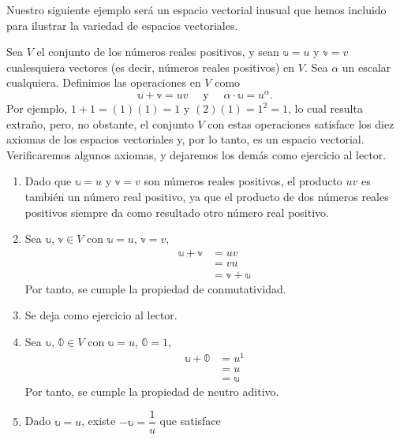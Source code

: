 \newpage

Nuestro siguiente ejemplo será un espacio vectorial inusual que hemos incluido para ilustrar la variedad de espacios vectoriales.

\begin{examplebox}{}{}
    Sea $V$ el conjunto de los números reales positivos, y sean $\mathbb{u} = u$ y $\mathbb{v} = v$ cualesquiera vectores (es decir, números reales positivos) en $V$. Sea $\alpha$ un escalar cualquiera. Definimos las operaciones en $V$ como
    $$\mathbb{u} + \mathbb{v} = uv \quad \text{ y } \quad \alpha \cdot \mathbb{u} = u^{\alpha}.$$
    Por ejemplo, $1 + 1 = (1)(1) = 1$ y $(2)(1) = 1^2 = 1$, lo cual resulta extraño, pero, no obstante, el conjunto $V$ con estas operaciones satisface los diez axiomas de los espacios vectoriales y, por lo tanto, es un espacio vectorial. Verificaremos algunos axiomas, y dejaremos los demás como ejercicio al lector.
    \begin{enumerate}[label=\roman*), topsep=6pt, itemsep=0pt]
        \item Dado que $\mathbb{u} = u$ y $\mathbb{v} = v$ son números reales positivos, el producto $uv$ es también un número real positivo, ya que el producto de dos números reales positivos siempre da como resultado otro número real positivo.
        \item Sea $\mathbb{u}$, $\mathbb{v} \in V$ con $\mathbb{u} = u$, $\mathbb{v} = v$,
        \begin{align*}
            \mathbb{u} + \mathbb{v} & = uv \\
            & = vu \\
            & = \mathbb{v} + \mathbb{u}
        \end{align*}
        Por tanto, se cumple la propiedad de conmutatividad.
        \item Se deja como ejercicio al lector.
        \item Sea $\mathbb{u}$, $\mathbb{0} \in V$ con $\mathbb{u} = u$, $\mathbb{0} = 1$,
        \begin{align*}
            \mathbb{u} + \mathbb{0} & = u^1 \\
            & = u \\
            & = \mathbb{u}
        \end{align*}
        Por tanto, se cumple la propiedad de neutro aditivo.
        \item Dado $\mathbb{u} = u$, existe $-\mathbb{u} = \dfrac{1}{u}$ que satisface
        \begin{align*}

\end{align*}
\end{enumerate}
\end{examplebox}
